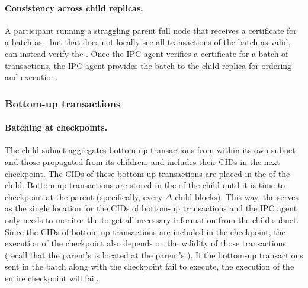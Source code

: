 \paragraph{Consistency across child replicas.} A participant running a straggling parent full node that receives a certificate for a batch as \prf, but that does not locally see all transactions of the batch as valid, can instead verify the \prf. Once the IPC agent verifies a certificate for a batch of transactions, the IPC agent provides the batch to the child replica for ordering and execution. 


\subsubsection{Bottom-up transactions}  
\paragraph{Batching at checkpoints.} The child subnet aggregates bottom-up transactions from within its own subnet and those propagated from its children, and includes their CIDs in the next checkpoint. The CIDs of these bottom-up transactions are placed in the \gw of the child. Bottom-up transactions are stored in the \gw of the child until it is time to checkpoint at the parent (specifically, every $\Delta$ child blocks). This way, the \gw serves as the single location for the CIDs of bottom-up transactions and the IPC agent only needs to monitor the \gw to get all necessary information from the child subnet. Since the CIDs of bottom-up transactions are included in the checkpoint, the execution of the checkpoint also depends on the validity of those transactions (recall that the parent's \postoffice is located at the parent's \gw). If the bottom-up transactions sent in the batch along with the checkpoint fail to execute, the execution of the entire checkpoint will fail.

